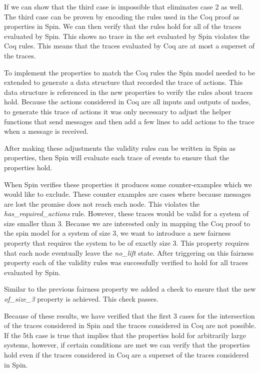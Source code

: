 \documentclass[runningheads]{llncs}
\begin{document}
If we can show that the third case is impossible that eliminates case 2 as well. The third case can be proven by encoding the rules used in the Coq proof as properties in Spin. We can then verify that the rules hold for all of the traces evaluated by Spin. This shows no trace in the set evaluated by Spin violates the Coq rules. This means that the traces evaluated by Coq are at most a superset of the traces. 

To implement the properties to match the Coq rules the Spin model needed to be extended to generate a data structure that recorded the trace of actions. This data structure is referenced in the new properties to verify the rules about traces hold. Because the actions considered in Coq are all inputs and outputs of nodes, to generate this trace of actions it was only necessary to adjust the helper functions that send messages and then add a few lines to add actions to the trace when a message is received. 

After making these adjustments the validity rules can be written in Spin as properties, then Spin will evaluate each trace of events to ensure that the properties hold. 

When Spin verifies these properties it produces some counter-examples which we would like to exclude. These counter examples are cases where because messages are lost the promise does not reach each node. This violates the \emph{has\_required\_actions} rule. However, these traces would be valid for a system of size smaller than 3. Because we are interested only in mapping the Coq proof to the spin model for a system of size 3, we want to introduce a new fairness property that requires the system to be of exactly size 3. This property requires that each node eventually leave the \emph{no\_lift} state. After triggering on this fairness property each of the validity rules was successfully verified to hold for all traces evaluated by Spin. 

Similar to the previous fairness property we added a check to ensure that the new \emph{of\_size\_3} property is achieved. This check passes.

Because of these results, we have verified that the first 3 cases for the intersection of the traces considered in Spin and the traces considered in Coq are not possible. If the 5th case is true that implies that the properties hold for arbitrarily large systems, however, if certain conditions are met we can verify that the properties hold even if the traces considered in Coq are a superset of the traces considered in Spin. 
\end{document}
